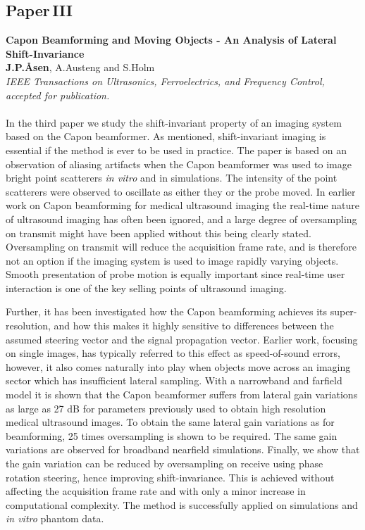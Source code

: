 \subsection{Paper\,III}
\textbf{Capon Beamforming and Moving Objects - An Analysis of Lateral Shift-Invariance}\\
\textbf{J.\:P.\:\AA{}sen}, A.\:Austeng and S.\:Holm\\
{\it IEEE Transactions on Ultrasonics, Ferroelectrics, and Frequency Control, accepted for publication.}\\\\
In the third paper we study the shift-invariant property of an imaging system based on the Capon beamformer. As mentioned, shift-invariant imaging is essential if the method is ever to be used in practice. The paper is based on an observation of aliasing artifacts when the Capon beamformer was used to image bright point scatterers \textit{in vitro} and in simulations. The intensity of the point scatterers were observed to oscillate as either they or the probe moved. In earlier work on Capon beamforming for medical ultrasound imaging the real-time nature of ultrasound imaging has often been ignored, and a large degree of oversampling on transmit might have been applied without this being clearly stated. Oversampling on transmit will reduce the acquisition frame rate, and is therefore not an option if the imaging system is used to image rapidly varying objects. Smooth presentation of probe motion is equally important since real-time user interaction is one of the key selling points of ultrasound imaging.

Further, it has been investigated how the Capon beamforming achieves its super-resolution, and how this makes it highly sensitive to differences between the assumed steering vector and the signal propagation vector. Earlier work, focusing on single images, has typically referred to this effect as speed-of-sound errors, however, it also comes naturally into play when objects move across an imaging sector which has insufficient lateral sampling. With a narrowband and farfield model it is shown that the Capon beamformer suffers from lateral gain variations as large as 27 dB for parameters previously used to obtain high resolution medical ultrasound images.  To obtain the same lateral gain variations as for  beamforming, 25 times oversampling is shown to be required. The same gain variations are observed for broadband nearfield simulations. Finally, we show that the gain variation can be reduced by oversampling on receive using phase rotation steering, hence improving shift-invariance. This is achieved without affecting the acquisition frame rate and with only a minor increase in computational complexity. The method is successfully applied on simulations and \textit{in vitro} phantom data.

